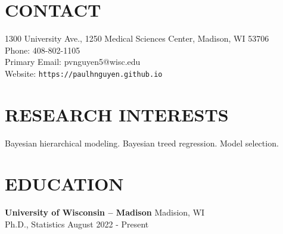 \documentclass[margin]{res}
\begin{document}
  
                        
\begin{resume}                        
  
  \section{CONTACT} 
  1300 University Ave., 1250 Medical Sciences Center, Madison, WI 53706 \\
  Phone: 408-802-1105 \\ 
  Primary Email: pvnguyen5@wisc.edu \\
  Website: \texttt{https://paulhnguyen.github.io}

  \section{RESEARCH INTERESTS}
  Bayesian hierarchical modeling. Bayesian treed regression. Model selection. 
              


              
\section{EDUCATION}      
                {\bf University of Wisconsin -- Madison} \hfill Madision, WI \\
                Ph.D., Statistics \hfill August 2022 - Present \\
                

\end{resume}
\end{document}
